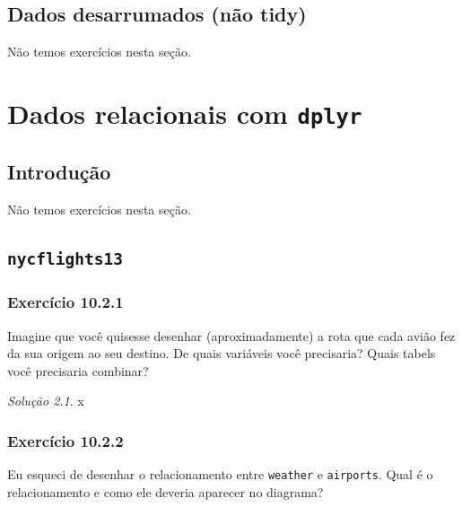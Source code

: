 \documentclass[
]{latex/krantz}
\theoremstyle{definition}
\theoremstyle{definition}
\theoremstyle{definition}
\theoremstyle{definition}
\theoremstyle{remark}
\newtheorem*{solution}{Solução}
\begin{document}
\hypertarget{dados-desarrumados-nuxe3o-tidy}{%
\section{Dados desarrumados (não tidy)}\label{dados-desarrumados-nuxe3o-tidy}}

Não temos exercícios nesta seção.

\hypertarget{dados-relacionais-com-dplyr}{%
\chapter{\texorpdfstring{Dados relacionais com \texttt{dplyr}}{Dados relacionais com dplyr}}\label{dados-relacionais-com-dplyr}}

\hypertarget{introduuxe7uxe3o-6}{%
\section{Introdução}\label{introduuxe7uxe3o-6}}

Não temos exercícios nesta seção.

\hypertarget{nycflights13}{%
\section{\texorpdfstring{\texttt{nycflights13}}{nycflights13}}\label{nycflights13}}

\hypertarget{exr10-2-1}{%
\subsection*{Exercício 10.2.1}\label{exr10-2-1}}

Imagine que você quisesse desenhar (aproximadamente) a rota que cada avião fez da sua origem ao seu destino. De quais variáveis você precisaria? Quais tabels você precisaria combinar?

\begin{solution}
x
\end{solution}

\hypertarget{exr10-2-2}{%
\subsection*{Exercício 10.2.2}\label{exr10-2-2}}

Eu esqueci de desenhar o relacionamento entre \texttt{weather} e \texttt{airports}. Qual é o relacionamento e como ele deveria aparecer no diagrama?
\end{document}
